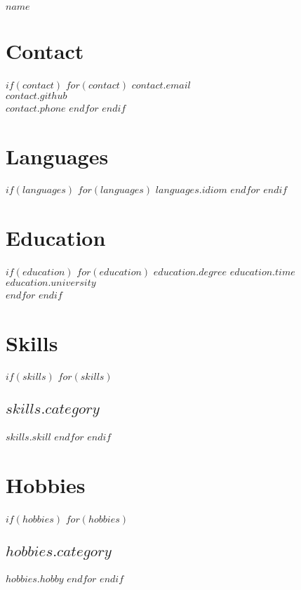 \documentclass[11pt,oneside,a4paper]{article}
\begin{document}

\begin{minipage}[t]{15cm}
 {\LARGE \bf $name$}\\[.2cm]
\end{minipage}

\begin{tcolorbox}
 \begin{minipage}[t]{4cm}
  \vspace*{-0.5cm}
  \begin{tcolorbox}[grow to left by=0.6cm,colback=white,colframe=white]
   \section*{Contact}
    $if(contact)$
     $for(contact)$
      $contact.email$ \\
      $contact.github$\\
      $contact.phone$
     $endfor$
    $endif$
   \section*{Languages}
    $if(languages)$
     $for(languages)$
      $languages.idiom$\newline
     $endfor$
    $endif$
   \section*{Education}
    $if(education)$
     $for(education)$
      $education.degree$\newline
      $education.time$\\
      $education.university$\\
     $endfor$
    $endif$
   \section*{Skills}
	$if(skills)$
	 $for(skills)$
          \subsection*{$skills.category$} 
           $skills.skill$
         $endfor$
	$endif$

	\section*{Hobbies}
	$if(hobbies)$
	 $for(hobbies)$
	  \subsection*{$hobbies.category$}
	   $hobbies.hobby$\newline
 	 $endfor$
	$endif$
  \end{tcolorbox}
 \end{minipage}
 \begin{minipage}[t]{15cm}
  \vspace*{-0.5cm}
  \begin{tcolorbox}[grow to right by=0.6cm,colback=white,colframe=white]

\end{tcolorbox}
\end{minipage}
\end{tcolorbox}
\end{document}
